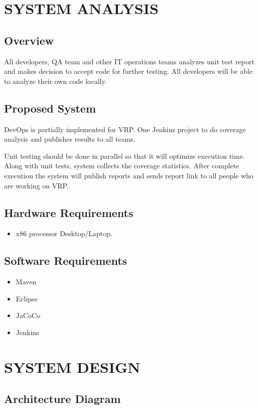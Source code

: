 \documentclass[a4paper,oneside,1,english1pt]{report}
\begin{document}
\chapter{\uppercase{System Analysis}}
	\section{Overview}
		\par  All developers, QA team and  other IT operations teams analyzes unit test report and makes decision to accept code for further testing. All developers will be able to analyze their own code locally.
	\section{Proposed System}
	
		\par DevOps is partially implemented for \ac{VRP}. One Jenkins project to do coverage analysis and publishes results to all teams. 
		\par Unit testing should be done in parallel so that it will optimize execution time. Along with unit tests, system collects the coverage statistics. After complete execution the system will publish reports and sends report link to all people who are working on \ac{VRP}.
	\section{Hardware Requirements}
		\begin{itemize}
			\item x86 processor Desktop/Laptop.
		\end{itemize}
	\section{Software Requirements}
		\begin{itemize}
			\item Maven
			\item Eclipse
			\item JaCoCo
			\item Jenkins
		\end{itemize}
	
\chapter{\uppercase{System Design}}

\section{Architecture Diagram}
\end{document}

